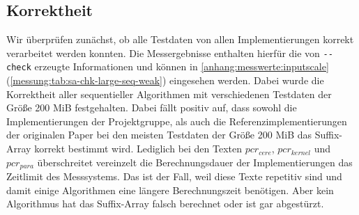 \subsection{\sa Korrektheit}

Wir überprüfen zunächst, ob alle Testdaten von allen Implementierungen korrekt verarbeitet werden konnten. Die Messergebnisse enthalten hierfür die von \texttt{-{}-check} erzeugte Informationen und können in \cref{anhang:messwerte:inputscale} (\cref{messung:tab:sa-chk-large-seq-weak}) eingesehen werden. Dabei wurde die Korrektheit aller sequentieller Algorithmen mit verschiedenen Testdaten der Größe 200 MiB festgehalten. Dabei fällt positiv auf, dass sowohl die Implementierungen der Projektgruppe, als auch die Referenzimplementierungen der originalen Paper bei den meisten Testdaten der Größe 200 MiB das Suffix-Array korrekt bestimmt wird. Lediglich bei den Texten \texttt{$pcr_{cere}$}, \texttt{$pcr_{kernel}$} und \texttt{$pcr_{para}$} überschreitet vereinzelt die Berechnungsdauer der Implementierungen das Zeitlimit des Messsystems. Das ist der Fall, weil diese Texte repetitiv sind und damit einige Algorithmen eine längere Berechnungszeit benötigen. Aber kein Algorithmus hat das Suffix-Array falsch berechnet oder ist gar abgestürzt.
